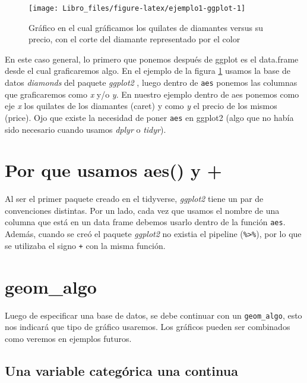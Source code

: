 \documentclass[]{book}
\begin{document}
\begin{figure}

{\centering \texttt{[image: Libro\_files/figure-latex/ejemplo1-ggplot-1]} 

}

\caption{Gráfico en el cual gráficamos los quilates de diamantes versus su precio, con el corte del diamante representado por el color}\label{fig:ejemplo1-ggplot}
\end{figure}

En este caso general, lo primero que ponemos después de ggplot es el
data.frame desde el cual graficaremos algo. En el ejemplo de la figura
\ref{fig:ejemplo1-ggplot} usamos la base de datos \emph{diamonds} del
paquete \emph{ggplot2} \citep{Wickhamggplot}, luego dentro de
\texttt{aes} ponemos las columnas que graficaremos como \emph{x} y/o
\emph{y}. En nuestro ejemplo dentro de aes ponemos como eje \emph{x} los
quilates de los diamantes (caret) y como \emph{y} el precio de los
mismos (price). Ojo que existe la necesidad de poner \texttt{aes} en
ggplot2 (algo que no había sido necesario cuando usamos \emph{dplyr} o
\emph{tidyr}).

\hypertarget{por-que-usamos-aes-y}{%
\section{Por que usamos aes() y +}\label{por-que-usamos-aes-y}}

Al ser el primer paquete creado en el tidyverse, \emph{ggplot2} tiene un
par de convenciones distintas. Por un lado, cada vez que usamos el
nombre de una columna que está en un data frame debemos usarlo dentro de
la función \texttt{aes}. Además, cuando se creó el paquete
\emph{ggplot2} no existia el pipeline (\texttt{\%\textgreater{}\%}), por
lo que se utilizaba el signo \texttt{+} con la misma función.

\hypertarget{geom_algo}{%
\section{geom\_algo}\label{geom_algo}}

Luego de especificar una base de datos, se debe continuar con un
\texttt{geom\_algo}, esto nos indicará que tipo de gráfico usaremos. Los
gráficos pueden ser combinados como veremos en ejemplos futuros.

\hypertarget{una-variable-categorica-una-continua}{%
\subsection{Una variable categórica una
continua}\label{una-variable-categorica-una-continua}}
\end{document}
